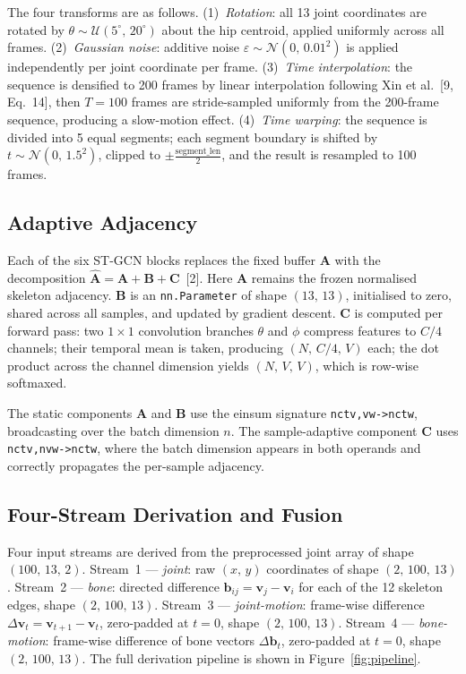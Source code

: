 The four transforms are as follows. (1)~\emph{Rotation}: all 13 joint coordinates are rotated by $\theta \sim \mathcal{U}(5^\circ,\,20^\circ)$ about the hip centroid, applied uniformly across all frames. (2)~\emph{Gaussian noise}: additive noise $\varepsilon \sim \mathcal{N}(0,\,0.01^2)$ is applied independently per joint coordinate per frame. (3)~\emph{Time interpolation}: the sequence is densified to 200 frames by linear interpolation following Xin et al.~[9, Eq.~14], then $T = 100$ frames are stride-sampled uniformly from the 200-frame sequence, producing a slow-motion effect. (4)~\emph{Time warping}: the sequence is divided into 5 equal segments; each segment boundary is shifted by $t \sim \mathcal{N}(0,\,1.5^2)$, clipped to $\pm\tfrac{\text{segment\_len}}{2}$, and the result is resampled to 100 frames.

\subsection{Adaptive Adjacency}
\label{subsec:adaptive}

Each of the six ST-GCN blocks replaces the fixed buffer $\mathbf{A}$ with the decomposition $\hat{\mathbf{A}} = \mathbf{A} + \mathbf{B} + \mathbf{C}$~[2]. Here $\mathbf{A}$ remains the frozen normalised skeleton adjacency. $\mathbf{B}$ is an \texttt{nn.Parameter} of shape $(13,\,13)$, initialised to zero, shared across all samples, and updated by gradient descent. $\mathbf{C}$ is computed per forward pass: two $1{\times}1$ convolution branches $\theta$ and $\phi$ compress features to $C/4$ channels; their temporal mean is taken, producing $(N,\,C/4,\,V)$ each; the dot product across the channel dimension yields $(N,\,V,\,V)$, which is row-wise softmaxed.

The static components $\mathbf{A}$ and $\mathbf{B}$ use the einsum signature \texttt{nctv,vw->nctw}, broadcasting over the batch dimension $n$. The sample-adaptive component $\mathbf{C}$ uses \texttt{nctv,nvw->nctw}, where the batch dimension appears in both operands and correctly propagates the per-sample adjacency.

\subsection{Four-Stream Derivation and Fusion}
\label{subsec:fourstream}

Four input streams are derived from the preprocessed joint array of shape $(100,\,13,\,2)$. Stream~1 --- \emph{joint}: raw $(x,\,y)$ coordinates of shape $(2,\,100,\,13)$. Stream~2 --- \emph{bone}: directed difference $\mathbf{b}_{ij} = \mathbf{v}_j - \mathbf{v}_i$ for each of the 12 skeleton edges, shape $(2,\,100,\,13)$. Stream~3 --- \emph{joint-motion}: frame-wise difference $\Delta\mathbf{v}_t = \mathbf{v}_{t+1} - \mathbf{v}_t$, zero-padded at $t = 0$, shape $(2,\,100,\,13)$. Stream~4 --- \emph{bone-motion}: frame-wise difference of bone vectors $\Delta\mathbf{b}_t$, zero-padded at $t = 0$, shape $(2,\,100,\,13)$. The full derivation pipeline is shown in Figure~\ref{fig:pipeline}.

